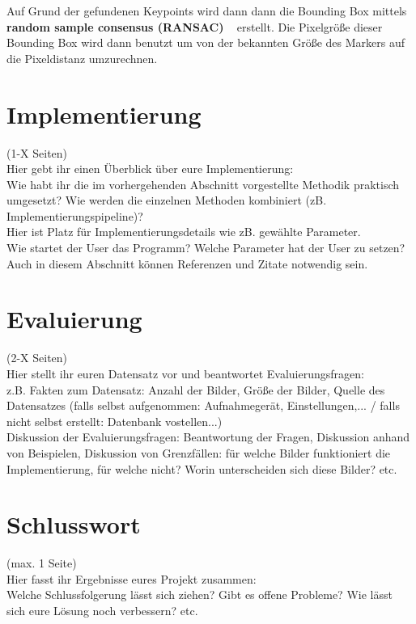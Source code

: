 \documentclass[deutsch]{scrartcl}
\begin{document}
Auf Grund der gefundenen Keypoints wird dann dann die Bounding Box mittels \textbf{random sample consensus (RANSAC)} ~\cite{fischler1981random} erstellt. Die Pixelgröße dieser Bounding Box wird dann benutzt um von der bekannten Größe des Markers auf die Pixeldistanz umzurechnen.




\section{Implementierung}
(1-X Seiten)\\
Hier gebt ihr einen Überblick über eure Implementierung:\\
Wie habt ihr die im vorhergehenden Abschnitt vorgestellte Methodik praktisch umgesetzt? Wie werden die einzelnen Methoden kombiniert (zB. Implementierungspipeline)?\\
Hier ist Platz für Implementierungsdetails wie zB. gewählte Parameter. \\
Wie startet der User das Programm? Welche Parameter hat der User zu setzen?\\
Auch in diesem Abschnitt können Referenzen und Zitate notwendig sein.\\

\section{Evaluierung}
(2-X Seiten)\\
Hier stellt ihr euren Datensatz vor und beantwortet Evaluierungsfragen:\\
z.B. Fakten zum Datensatz: Anzahl der Bilder, Größe der Bilder, Quelle des Datensatzes (falls selbst aufgenommen: Aufnahmegerät, Einstellungen,... / falls nicht selbst erstellt: Datenbank vostellen...)\\
Diskussion der Evaluierungsfragen: Beantwortung der Fragen, Diskussion anhand von Beispielen, Diskussion von Grenzfällen: für welche Bilder funktioniert die Implementierung, für welche nicht? Worin unterscheiden sich diese Bilder? etc.

\section{Schlusswort}
(max. 1 Seite)\\
Hier fasst ihr Ergebnisse eures Projekt zusammen:\\
Welche Schlussfolgerung lässt sich ziehen? Gibt es offene Probleme? Wie lässt sich eure Lösung noch verbessern? etc.



\nocite{*}

\end{document}
